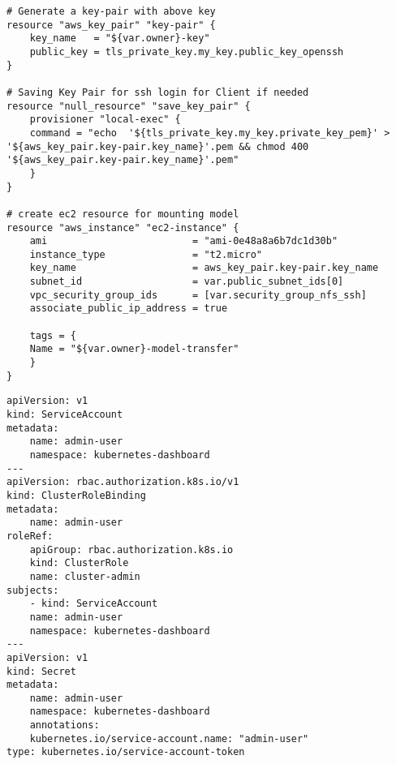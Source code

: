 \begin{appendices}
\begin{lstlisting}[caption={Terraform Configuration for Setting Up EC2 Instance}, label={lst:ec2_setup}]
# Generate a key-pair with above key
resource "aws_key_pair" "key-pair" {
    key_name   = "${var.owner}-key"
    public_key = tls_private_key.my_key.public_key_openssh
}

# Saving Key Pair for ssh login for Client if needed
resource "null_resource" "save_key_pair" {
    provisioner "local-exec" {
    command = "echo  '${tls_private_key.my_key.private_key_pem}' > '${aws_key_pair.key-pair.key_name}'.pem && chmod 400 '${aws_key_pair.key-pair.key_name}'.pem"
    }
}

# create ec2 resource for mounting model
resource "aws_instance" "ec2-instance" {
    ami                         = "ami-0e48a8a6b7dc1d30b"
    instance_type               = "t2.micro"
    key_name                    = aws_key_pair.key-pair.key_name
    subnet_id                   = var.public_subnet_ids[0]
    vpc_security_group_ids      = [var.security_group_nfs_ssh]
    associate_public_ip_address = true

    tags = {
    Name = "${var.owner}-model-transfer"
    }
}
\end{lstlisting}

\begin{lstlisting}[language=Kubernetes, caption={Kubernetes Configuration for Setting Up Dashboard Dependencies}, label={lst:k8s_dashboard_dependencies}]
apiVersion: v1
kind: ServiceAccount
metadata:
    name: admin-user
    namespace: kubernetes-dashboard
---
apiVersion: rbac.authorization.k8s.io/v1
kind: ClusterRoleBinding
metadata:
    name: admin-user
roleRef:
    apiGroup: rbac.authorization.k8s.io
    kind: ClusterRole
    name: cluster-admin
subjects:
    - kind: ServiceAccount
    name: admin-user
    namespace: kubernetes-dashboard
---
apiVersion: v1
kind: Secret
metadata:
    name: admin-user
    namespace: kubernetes-dashboard
    annotations:
    kubernetes.io/service-account.name: "admin-user"
type: kubernetes.io/service-account-token
\end{lstlisting}

\end{appendices}
